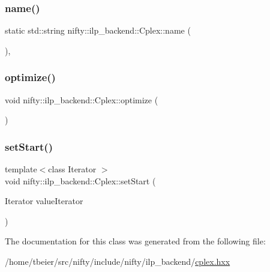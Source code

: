 \mbox{\label{classnifty_1_1ilp__backend_1_1Cplex_a35cb51113bf3b858d470f9c742884cdc}} 
\subsubsection{\texorpdfstring{name()}{name()}}
{\footnotesize\ttfamily static std\+::string nifty\+::ilp\+\_\+backend\+::\+Cplex\+::name (\begin{DoxyParamCaption}{ }\end{DoxyParamCaption})\hspace{0.3cm}{\ttfamily [inline]}, {\ttfamily [static]}}

\mbox{\label{classnifty_1_1ilp__backend_1_1Cplex_aa0055358a4aef6b8b660c14422500b23}} 
\subsubsection{\texorpdfstring{optimize()}{optimize()}}
{\footnotesize\ttfamily void nifty\+::ilp\+\_\+backend\+::\+Cplex\+::optimize (\begin{DoxyParamCaption}{ }\end{DoxyParamCaption})\hspace{0.3cm}{\ttfamily [inline]}}

\mbox{\label{classnifty_1_1ilp__backend_1_1Cplex_a1c773d38cf7a0434247a87ee96531c57}} 
\subsubsection{\texorpdfstring{set\+Start()}{setStart()}}
{\footnotesize\ttfamily template$<$class Iterator $>$ \\
void nifty\+::ilp\+\_\+backend\+::\+Cplex\+::set\+Start (\begin{DoxyParamCaption}\item[{Iterator}]{value\+Iterator }\end{DoxyParamCaption})\hspace{0.3cm}{\ttfamily [inline]}}



The documentation for this class was generated from the following file\+:\begin{DoxyCompactItemize}
\item 
/home/tbeier/src/nifty/include/nifty/ilp\+\_\+backend/\hyperlink{cplex_8hxx}{cplex.\+hxx}\end{DoxyCompactItemize}
